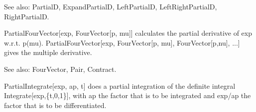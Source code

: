 See also:  PartialD, ExpandPartialD, LeftPartialD, LeftRightPartialD, RightPartialD.


\dispSFinmath{
\mu
}






PartialFourVector[exp, FourVector[p, mu]] { }calculates the partial derivative of exp w.r.t. p(mu). PartialFourVector[exp, FourVector[p,
  mu], FourVector[p,nu], ...] { }gives the multiple derivative.

See also:  FourVector, Pair, Contract.






 PartialIntegrate[exp, ap, t] does a partial integration of the definite integral Integrate[exp,\{t,0,1\}], with ap the factor that is to
  be integrated and exp/ap the factor that is to be differentiated.










